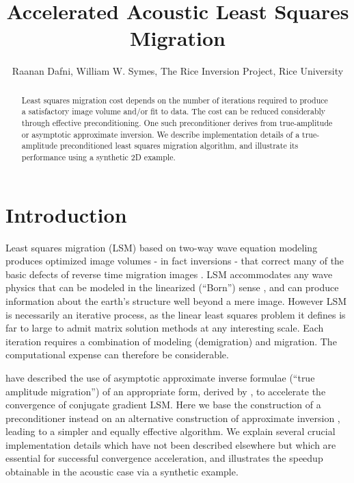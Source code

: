 \title{Accelerated Acoustic Least Squares Migration}
\renewcommand{\thefootnote}{\fnsymbol{footnote}} \author{Raanan
  Dafni, William W. Symes\footnotemark[1], The Rice Inversion Project,
  Rice University}
\captionsetup{font=scriptsize,labelfont=scriptsize}
\maketitle

\begin{abstract}
Least squares migration cost depends on the number of iterations
required to produce a satisfactory image volume and/or fit to data. The
cost can be reduced considerably through effective
preconditioning. One such preconditioner derives from true-amplitude
or asymptotic approximate inversion. We describe implementation details of a
true-amplitude preconditioned least squares migration algorithm, and illustrate
its performance using a synthetic 2D example.
\end{abstract}

\section{Introduction}
Least squares migration (LSM) based on two-way wave equation modeling
produces optimized image volumes - in fact inversions - that correct
many of the basic defects of reverse time migration images
\cite[]{Dutta:SEG14,DaiBS:2010,DaiSchuster2013,Nemeth:99,ChaventPlessix:98}. LSM
accommodates any wave physics that can be modeled in the linearized
(``Born'') sense \cite[]{duan2017elastic,sun:SEG15,DuttaSchuster:14},
and can produce information about the earth's structure well beyond a
mere image. However LSM is necessarily an iterative process, as the
linear least squares problem it defines is far to large to admit
matrix solution methods at any interesting scale. Each iteration
requires a combination of modeling (demigration) and migration. The
computational expense can therefore be considerable.

\cite{HouSymes:EAGE16} have described the use of asymptotic approximate
  inverse formulae (``true amplitude migration'') of an appropriate form, derived by
  \cite{HouSymes:15}, to accelerate the
  convergence of conjugate gradient LSM. Here we base the construction
  of a preconditioner instead on an alternative construction of approximate inversion 
  \cite[]{HouSymes:17,tenKroode:12}, leading to a simpler and equally
  effective algorithm. We explain several crucial 
  implementation details which have not been described elsewhere but
  which are essential for successful convergence
  acceleration, and illustrates the speedup obtainable in the acoustic
  case via a synthetic example.

